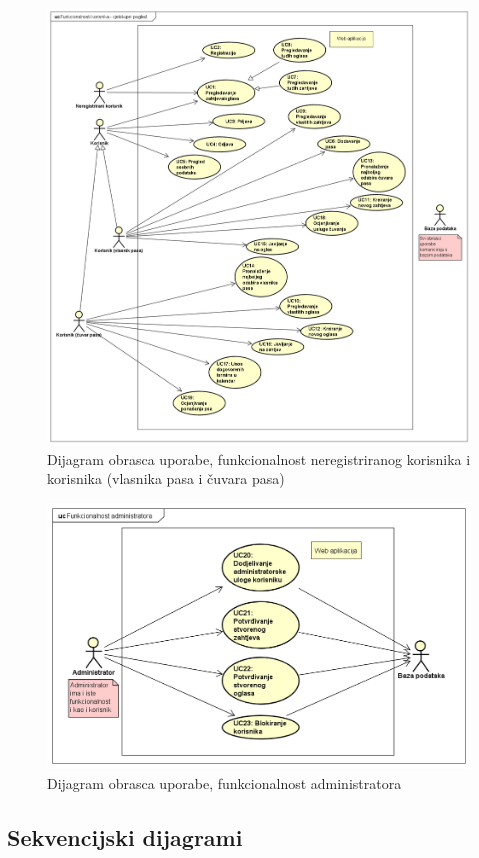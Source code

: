 					\begin{figure}[htb]
						\centering
						\includegraphics[width=12cm]{slike/korisnikExport}
						\caption{Dijagram obrasca uporabe, funkcionalnost neregistriranog korisnika i korisnika (vlasnika pasa i čuvara pasa)}
						\label{fig:DOU-korisnici}
					\end{figure}
				\eject		
					\begin{figure}[htb]
						\centering
						\includegraphics[width=12cm]{slike/dijagramExport}
						\caption{Dijagram obrasca uporabe, funkcionalnost administratora}
						\label{fig:DOU-administrator}
					\end{figure}
				\eject		
				
			\subsection{Sekvencijski dijagrami}
				
